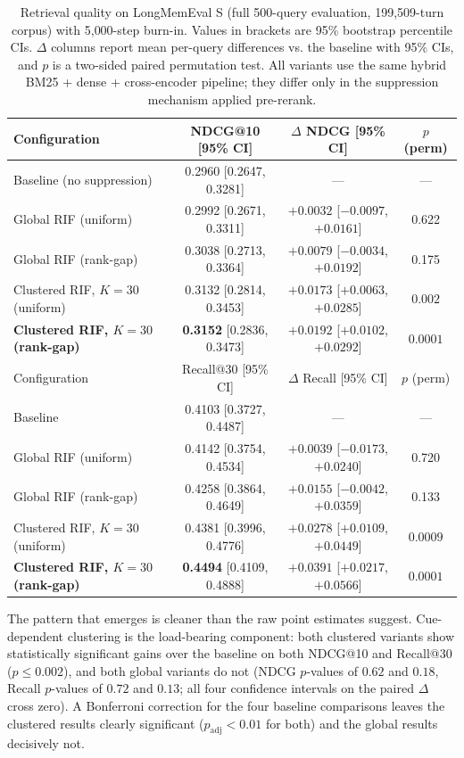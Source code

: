 \documentclass[11pt,a4paper]{article}
\begin{document}
\begin{table}[ht]
\centering
\small
\caption{Retrieval quality on LongMemEval S (full 500-query evaluation, 199{,}509-turn corpus) with 5{,}000-step burn-in. Values in brackets are 95\% bootstrap percentile CIs. $\Delta$ columns report mean per-query differences vs. the baseline with 95\% CIs, and $p$ is a two-sided paired permutation test. All variants use the same hybrid BM25 + dense + cross-encoder pipeline; they differ only in the suppression mechanism applied pre-rerank.}
\label{tab:main}
\begin{tabular}{lccc}
\toprule
Configuration & NDCG@10 [95\% CI] & $\Delta$ NDCG [95\% CI] & $p$ (perm) \\
\midrule
Baseline (no suppression) & 0.2960 [0.2647, 0.3281] & --- & --- \\
Global RIF (uniform) & 0.2992 [0.2671, 0.3311] & $+0.0032$ [$-0.0097$, $+0.0161$] & 0.622 \\
Global RIF (rank-gap) & 0.3038 [0.2713, 0.3364] & $+0.0079$ [$-0.0034$, $+0.0192$] & 0.175 \\
Clustered RIF, $K=30$ (uniform) & 0.3132 [0.2814, 0.3453] & $+0.0173$ [$+0.0063$, $+0.0285$] & $\mathbf{0.002}$ \\
\textbf{Clustered RIF, $K=30$ (rank-gap)} & \textbf{0.3152} [0.2836, 0.3473] & $\mathbf{+0.0192}$ [$+0.0102$, $+0.0292$] & $\mathbf{0.0001}$ \\
\midrule
Configuration & Recall@30 [95\% CI] & $\Delta$ Recall [95\% CI] & $p$ (perm) \\
\midrule
Baseline & 0.4103 [0.3727, 0.4487] & --- & --- \\
Global RIF (uniform) & 0.4142 [0.3754, 0.4534] & $+0.0039$ [$-0.0173$, $+0.0240$] & 0.720 \\
Global RIF (rank-gap) & 0.4258 [0.3864, 0.4649] & $+0.0155$ [$-0.0042$, $+0.0359$] & 0.133 \\
Clustered RIF, $K=30$ (uniform) & 0.4381 [0.3996, 0.4776] & $+0.0278$ [$+0.0109$, $+0.0449$] & $\mathbf{0.0009}$ \\
\textbf{Clustered RIF, $K=30$ (rank-gap)} & \textbf{0.4494} [0.4109, 0.4888] & $\mathbf{+0.0391}$ [$+0.0217$, $+0.0566$] & $\mathbf{0.0001}$ \\
\bottomrule
\end{tabular}
\end{table}

The pattern that emerges is cleaner than the raw point estimates suggest. Cue-dependent clustering is the load-bearing component: both clustered variants show statistically significant gains over the baseline on both NDCG@10 and Recall@30 ($p \leq 0.002$), and both global variants do not (NDCG $p$-values of $0.62$ and $0.18$, Recall $p$-values of $0.72$ and $0.13$; all four confidence intervals on the paired $\Delta$ cross zero). A Bonferroni correction for the four baseline comparisons leaves the clustered results clearly significant ($p_{\text{adj}} < 0.01$ for both) and the global results decisively not.
\end{document}
